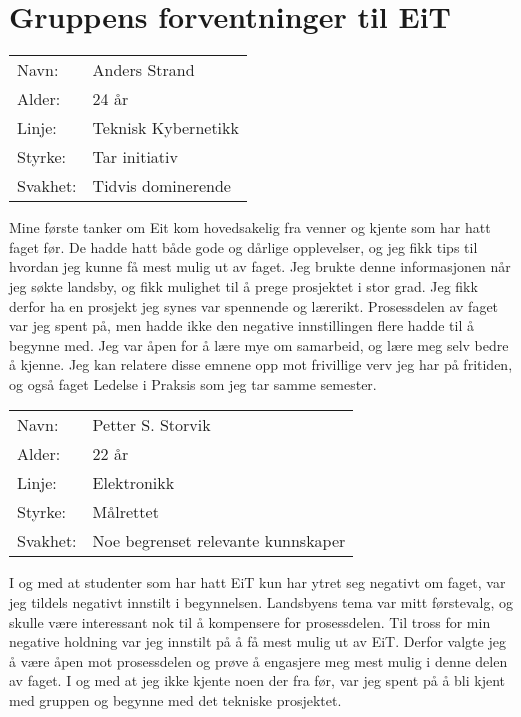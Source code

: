 \section{Gruppens forventninger til EiT}

\begin{table}[H]
\begin{tabular}{l l}
        Navn: & Anders Strand \\
        Alder: & 24 år \\ 
        Linje: & Teknisk Kybernetikk \\
        Styrke: & Tar initiativ \\
        Svakhet: & Tidvis dominerende
    \end{tabular}
\end{table}

Mine første tanker om Eit kom hovedsakelig fra venner og kjente som har hatt faget før.
De hadde hatt både gode og dårlige opplevelser, og jeg fikk tips til hvordan jeg kunne få mest mulig ut av faget. 
Jeg brukte denne informasjonen når jeg søkte landsby, og fikk mulighet til å prege prosjektet i stor grad. 
Jeg fikk derfor ha en prosjekt jeg synes var spennende og lærerikt.
Prosessdelen av faget var jeg spent på, men hadde ikke den negative innstillingen flere hadde til å begynne med. 
Jeg var åpen for å lære mye om samarbeid, og lære meg selv bedre å kjenne. 
Jeg kan relatere disse emnene opp mot frivillige verv jeg har på fritiden, og også faget Ledelse i Praksis som jeg tar samme semester.

\begin{table}[H]
    \begin{tabular}{l l}
        Navn: & Petter S. Storvik \\
        Alder: & 22 år \\ 
        Linje: & Elektronikk \\
        Styrke: & Målrettet \\
        Svakhet: & Noe begrenset relevante kunnskaper
    \end{tabular}
\end{table}

I og med at studenter som har hatt EiT kun har ytret seg negativt om faget, var jeg tildels negativt innstilt i begynnelsen. 
Landsbyens tema var mitt førstevalg, og skulle være interessant nok til å kompensere for prosessdelen. 
Til tross for min negative holdning var jeg innstilt på å få mest mulig ut av EiT.
Derfor valgte jeg å være åpen mot prosessdelen og prøve å engasjere meg mest mulig i denne delen av faget. 
I og med at jeg ikke kjente noen der fra før, var jeg spent på å bli kjent med gruppen og begynne med det tekniske prosjektet. 

